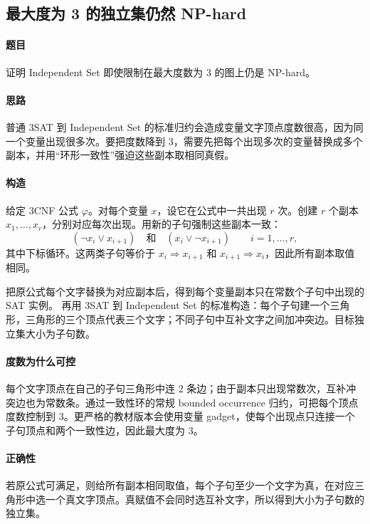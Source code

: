 \documentclass[UTF8,openany,12pt]{ctexbook}
\theoremstyle{remark}
\begin{document}
\subsection{最大度为 3 的独立集仍然 NP-hard}

\paragraph{题目}
证明 Independent Set 即使限制在最大度数为 $3$ 的图上仍是 NP-hard。

\paragraph{思路}
普通 3SAT 到 Independent Set 的标准归约会造成变量文字顶点度数很高，因为同一个变量出现很多次。要把度数降到 $3$，需要先把每个出现多次的变量替换成多个副本，并用“环形一致性”强迫这些副本取相同真假。

\paragraph{构造}
给定 3CNF 公式 $\varphi$。对每个变量 $x$，设它在公式中一共出现 $r$ 次。创建 $r$ 个副本
$x_1,\dots,x_r$，分别对应每次出现。用新的子句强制这些副本一致：
\[
  (\neg x_i\vee x_{i+1})\quad\text{和}\quad(x_i\vee \neg x_{i+1})
  \qquad i=1,\dots,r,
\]
其中下标循环。这两类子句等价于 $x_i\Rightarrow x_{i+1}$ 和
$x_{i+1}\Rightarrow x_i$，因此所有副本取值相同。

把原公式每个文字替换为对应副本后，得到每个变量副本只在常数个子句中出现的 SAT 实例。
再用 3SAT 到 Independent Set 的标准构造：每个子句建一个三角形，三角形的三个顶点代表三个文字；不同子句中互补文字之间加冲突边。目标独立集大小为子句数。

\paragraph{度数为什么可控}
每个文字顶点在自己的子句三角形中连 $2$ 条边；由于副本只出现常数次，互补冲突边也为常数条。通过一致性环的常规 bounded occurrence 归约，可把每个顶点度数控制到 $3$。更严格的教材版本会使用变量 gadget，使每个出现点只连接一个子句顶点和两个一致性边，因此最大度为 $3$。

\paragraph{正确性}
若原公式可满足，则给所有副本相同取值，每个子句至少一个文字为真，在对应三角形中选一个真文字顶点。真赋值不会同时选互补文字，所以得到大小为子句数的独立集。
\end{document}
